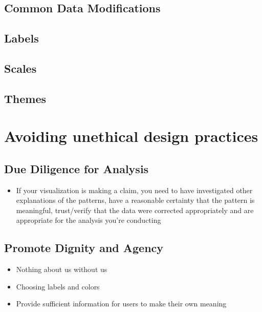 \documentclass[
]{krantz}
\providecommand{\tightlist}{%
  \setlength{\itemsep}{0pt}\setlength{\parskip}{0pt}}
\begin{document}
\hypertarget{common-data-modifications}{%
\section{Common Data Modifications}\label{common-data-modifications}}

\hypertarget{labels}{%
\section{Labels}\label{labels}}

\hypertarget{scales}{%
\section{Scales}\label{scales}}

\hypertarget{themes}{%
\section{Themes}\label{themes}}

\hypertarget{ethical-design-practices}{%
\chapter{Avoiding unethical design practices}\label{ethical-design-practices}}

\hypertarget{due-diligence-for-analysis}{%
\section{Due Diligence for Analysis}\label{due-diligence-for-analysis}}

\begin{itemize}
\tightlist
\item
  If your visualization is making a claim, you need to have investigated other
  explanations of the patterns, have a reasonable certainty that the pattern is
  meaningful, trust/verify that the data were corrected appropriately and are
  appropriate for the analysis you're conducting
\end{itemize}

\hypertarget{promote-dignity-and-agency}{%
\section{Promote Dignity and Agency}\label{promote-dignity-and-agency}}

\begin{itemize}
\tightlist
\item
  Nothing about us without us
\item
  Choosing labels and colors
\item
  Provide sufficient information for users to make their own meaning
\end{itemize}
\end{document}
